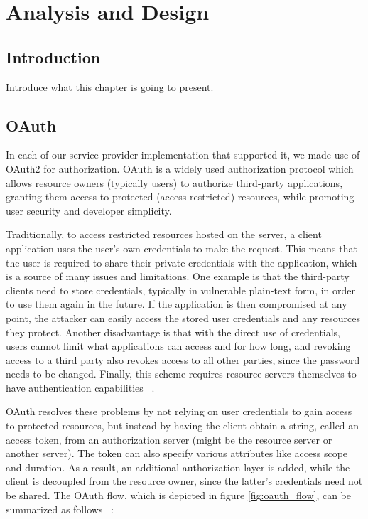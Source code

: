 \chapter{Analysis and Design}

\section{Introduction}
Introduce what this chapter is going to present.

\section{OAuth}
In each of our service provider implementation that supported it, we made use of OAuth2 for authorization.  OAuth is a widely used authorization protocol which allows resource owners (typically users) to authorize third-party applications, granting them access to protected (access-restricted) resources, while promoting user security and developer simplicity.  

Traditionally, to access restricted resources hosted on the server, a client application uses the user's own credentials  to make the request. This means that the user is required to share their private credentials with the application, which is a source of many issues and limitations. One example is that the third-party clients need to store credentials, typically in vulnerable plain-text form,  in order to use them again in the future. If the application is then compromised at any point, the attacker can easily access the stored user credentials and any resources they protect. Another disadvantage is that with the direct use of credentials, users cannot limit what applications can access and for how long, and revoking access to a third party also revokes access to all other parties, since the password needs to be changed. Finally, this scheme requires resource servers themselves to have authentication capabilities ~\cite{oauth}.

OAuth resolves these problems by not relying on user credentials to gain access to protected resources, but instead by having the client obtain a string, called an access token, from an authorization server (might be the resource server or another server).  The token can also specify various attributes like access scope and duration. As a result, an additional authorization layer is added, while the client is decoupled from the resource owner, since the latter's credentials need not be shared. The OAuth flow, which is depicted in figure \ref{fig:oauth_flow}, can be summarized as follows ~\cite{oauth}:

